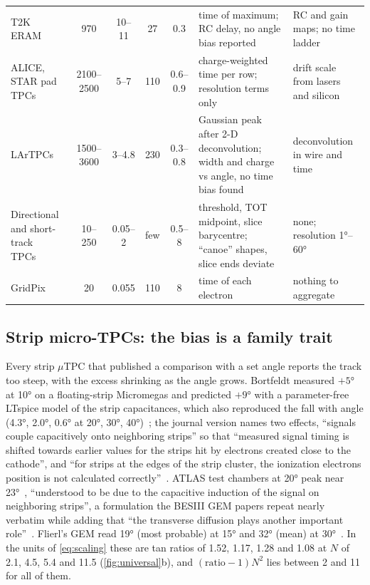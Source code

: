 \begin{table}[t]
\begin{tabular}{@{}p{3.1cm}cccc>{\raggedright\arraybackslash}p{3.0cm}>{\raggedright\arraybackslash}p{2.9cm}@{}}
    T2K ERAM~\cite{T2K2022,T2K2023} & 970 & 10--11 & 27 & 0.3 & time of maximum; RC delay, no angle bias reported & RC and gain maps; no time ladder \\
    ALICE, STAR pad TPCs~\cite{Alme2010,Anderson2003} & 2100--2500 & 5--7 & 110 & 0.6--0.9 & charge-weighted time per row; resolution terms only & drift scale from lasers and silicon \\
    LArTPCs~\cite{Adams2018a,Adams2018b,ProtoDUNE2020,ICARUS2024} & 1500--3600 & 3--4.8 & 230 & 0.3--0.8 & Gaussian peak after 2-D deconvolution; width and charge vs angle, no time bias found & deconvolution in wire and time \\
    Directional and short-track TPCs~\cite{MIMAC2020,BEAST2019,MAIKo2018} & 10--250 & 0.05--2 & few & 0.5--8 & threshold, TOT midpoint, slice barycentre; ``canoe'' shapes, slice ends deviate & none; resolution \ang{1}--\ang{60} \\
    GridPix~\cite{GridPix2018} & 20 & 0.055 & 110 & 8 & time of each electron & nothing to aggregate \\
    \bottomrule
  \end{tabular}
\end{table}

\subsection{Strip micro-TPCs: the bias is a family trait}

Every strip $\mu$TPC that published a comparison with a set angle reports the track too steep, with the excess shrinking as
the angle grows. Bortfeldt measured $+\ang{5}$ at \ang{10} on a floating-strip Micromegas and predicted $+\ang{9}$ with a
parameter-free LTspice model of the strip capacitances, which also reproduced the fall with angle (\ang{4.3}, \ang{2.0}, \ang{0.6}
at \ang{20}, \ang{30}, \ang{40})~\cite{Bortfeldt2014}; the journal version names two effects, ``signals couple capacitively onto
neighboring strips'' so that ``measured signal timing is shifted towards earlier values for the strips hit by electrons created
close to the cathode'', and ``for strips at the edges of the strip cluster, the ionization electrons position is not calculated
correctly''~\cite{Bortfeldt2015}. ATLAS test chambers at \ang{20} peak near \ang{23}~\cite{Iodice2015}, ``understood to be due to
the capacitive induction of the signal on neighboring strips'', a formulation the BESIII GEM papers repeat nearly verbatim while
adding that ``the transverse diffusion plays another important role''~\cite{Alexeev2019}. Flierl's GEM read \ang{19} (most probable)
at \ang{15} and \ang{32} (mean) at \ang{30}~\cite{Flierl2018}. In the units of \cref{eq:scaling} these are tan ratios of 1.52, 1.17, 1.28
and 1.08 at $N$ of 2.1, 4.5, 5.4 and 11.5 (\cref{fig:universal}b), and $(\text{ratio}-1)N^2$ lies between 2 and 11 for all of
them.

